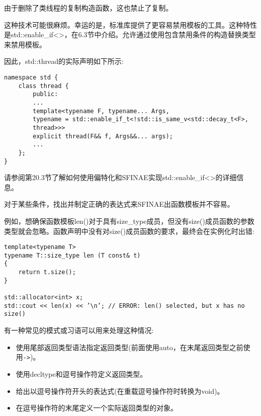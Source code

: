 \begin{tcolorbox}[colback=webgreen!5!white,colframe=webgreen!75!black]
\hspace*{0.75cm}由于删除了类线程的复制构造函数，这也禁止了复制。
\end{tcolorbox}

这种技术可能很麻烦。幸运的是，标准库提供了更容易禁用模板的工具。这种特性是std::enable\_if<>，在6.3节中介绍。允许通过使用包含禁用条件的构造替换类型来禁用模板。

因此，std::thread的实际声明如下所示:

\begin{lstlisting}[style=styleCXX]
namespace std {
	class thread {
		public:
		...
		template<typename F, typename... Args,
		typename = std::enable_if_t<!std::is_same_v<std::decay_t<F>,
		thread>>>
		explicit thread(F&& f, Args&&... args);
		...
	};
}
\end{lstlisting}

请参阅第20.3节了解如何使用偏特化和SFINAE实现std::enable\_if<>的详细信息。



对于某些条件，找出并制定正确的表达式来SFINAE出函数模板并不容易。

例如，想确保函数模板len()对于具有size\_type成员，但没有size()成员函数的参数类型就会忽略。函数声明中没有对size()成员函数的要求，最终会在实例化时出错:

\begin{lstlisting}[style=styleCXX]
template<typename T>
typename T::size_type len (T const& t)
{
	return t.size();
}

std::allocator<int> x;
std::cout << len(x) << ’\n’; // ERROR: len() selected, but x has no size()
\end{lstlisting}

有一种常见的模式或习语可以用来处理这种情况:

\begin{itemize}
\item 
使用尾部返回类型语法指定返回类型(前面使用auto，在末尾返回类型之前使用\texttt{->})。

\item 
使用decltype和逗号操作符定义返回类型。

\item 
给出以逗号操作符开头的表达式(在重载逗号操作符时转换为void)。

\item 
在逗号操作符的末尾定义一个实际返回类型的对象。
\end{itemize}

